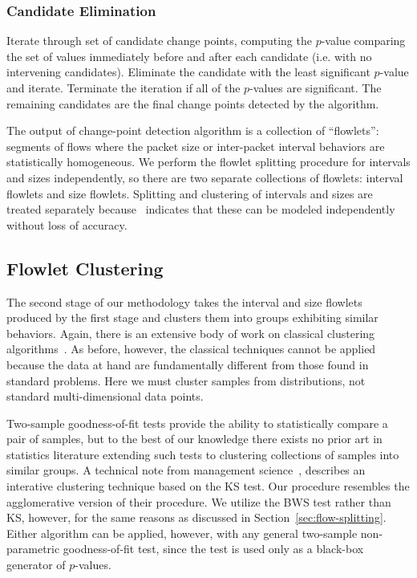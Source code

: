 \documentclass[conference]{IEEEtran}
\newcommand{\caps}[1]{{\small{#1}}}
\begin{document}
\subsubsection{Candidate Elimination}
Iterate through set of candidate change points, computing the $p$-value comparing the set of values immediately before and after each candidate (i.e. with no intervening candidates). Eliminate the candidate with the least significant $p$-value and iterate. Terminate the iteration if all of the $p$-values are significant. The remaining candidates are the final change points detected by the algorithm.

The output of change-point detection algorithm is a collection of ``flowlets'': segments of flows where the packet size or inter-packet interval behaviors are statistically homogeneous. %
We perform the flowlet splitting procedure for intervals and sizes independently, so there are two separate collections of flowlets: interval flowlets and size flowlets. Splitting and clustering of intervals and sizes are treated separately because~\cite{Karpinski07:realism} indicates that these can be modeled independently without loss of accuracy.

\subsection{Flowlet Clustering}\label{sec:flowlet-clustering}

The second stage of our methodology takes the interval and size flowlets produced by the first stage and clusters them into groups exhibiting similar behaviors. Again, there is an extensive body of work on classical clustering algorithms~\cite{Jain99}. As before, however, the classical techniques cannot be applied because the data at hand are fundamentally different from those found in standard problems. Here we must cluster samples from distributions, not standard multi-dimensional data points.

Two-sample goodness-of-fit tests provide the ability to statistically compare a pair of samples, but to the best of our knowledge there exists no prior art in statistics literature extending such tests to clustering collections of samples into similar groups. A technical note from management science~\cite{Ruefli00}, describes an interative clustering technique based on the \caps{KS} test. Our procedure resembles the agglomerative version of their procedure. We utilize the \caps{BWS} test rather than \caps{KS}, however, for the same reasons as discussed in Section~\ref{sec:flow-splitting}. Either algorithm can be applied, however, with any general two-sample non-parametric goodness-of-fit test, since the test is used only as a black-box generator of $p$-values.
\end{document}
